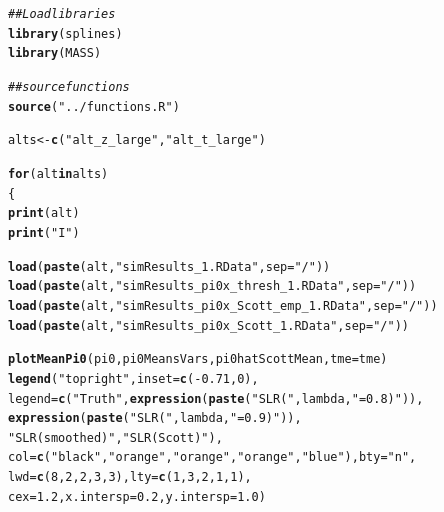 \documentclass{article}\usepackage[]{graphicx}\usepackage[]{color}
\makeatletter
\newcommand{\hlnum}[1]{\textcolor[rgb]{0.686,0.059,0.569}{#1}}%
\newcommand{\hlstr}[1]{\textcolor[rgb]{0.192,0.494,0.8}{#1}}%
\newcommand{\hlcom}[1]{\textcolor[rgb]{0.678,0.584,0.686}{\textit{#1}}}%
\newcommand{\hlopt}[1]{\textcolor[rgb]{0,0,0}{#1}}%
\newcommand{\hlstd}[1]{\textcolor[rgb]{0.345,0.345,0.345}{#1}}%
\newcommand{\hlkwa}[1]{\textcolor[rgb]{0.161,0.373,0.58}{\textbf{#1}}}%
\newcommand{\hlkwb}[1]{\textcolor[rgb]{0.69,0.353,0.396}{#1}}%
\newcommand{\hlkwc}[1]{\textcolor[rgb]{0.333,0.667,0.333}{#1}}%
\newcommand{\hlkwd}[1]{\textcolor[rgb]{0.737,0.353,0.396}{\textbf{#1}}}%
\newenvironment{kframe}{%
 \def\at@end@of@kframe{}%
 \ifinner\ifhmode%
  \def\at@end@of@kframe{\end{minipage}}%
  \begin{minipage}{\columnwidth}%
 \fi\fi%
 \def\FrameCommand##1{\hskip\@totalleftmargin \hskip-\fboxsep
 \colorbox{shadecolor}{##1}\hskip-\fboxsep
     \hskip-\linewidth \hskip-\@totalleftmargin \hskip\columnwidth}%
 \MakeFramed {\advance\hsize-\width
   \@totalleftmargin\z@ \linewidth\hsize
   \@setminipage}}%
 {\par\unskip\endMakeFramed%
 \at@end@of@kframe}
\newenvironment{knitrout}{}{} %
\makeatother
\begin{document}
\begin{knitrout}
\color{fgcolor}\begin{kframe}
\begin{alltt}
\hlcom{## Load libraries}
\hlkwd{library}\hlstd{(splines)}
\hlkwd{library}\hlstd{(MASS)}

\hlcom{##source functions}
\hlkwd{source}\hlstd{(}\hlstr{"../functions.R"}\hlstd{)}
\end{alltt}
\end{kframe}
\end{knitrout}

\begin{knitrout}
\color{fgcolor}\begin{kframe}
\begin{alltt}
\hlstd{alts} \hlkwb{<-} \hlkwd{c}\hlstd{(}\hlstr{"alt_z_large"}\hlstd{,}\hlstr{"alt_t_large"}\hlstd{)}

\hlkwa{for}\hlstd{(alt} \hlkwa{in} \hlstd{alts)}
\hlstd{\{}
  \hlkwd{print}\hlstd{(alt)}
  \hlkwd{print}\hlstd{(}\hlstr{"I"}\hlstd{)}

  \hlkwd{load}\hlstd{(}\hlkwd{paste}\hlstd{(alt,}\hlstr{"simResults_1.RData"}\hlstd{,}\hlkwc{sep}\hlstd{=}\hlstr{"/"}\hlstd{))}
  \hlkwd{load}\hlstd{(}\hlkwd{paste}\hlstd{(alt,}\hlstr{"simResults_pi0x_thresh_1.RData"}\hlstd{,}\hlkwc{sep}\hlstd{=}\hlstr{"/"}\hlstd{))}
  \hlkwd{load}\hlstd{(}\hlkwd{paste}\hlstd{(alt,}\hlstr{"simResults_pi0x_Scott_emp_1.RData"}\hlstd{,}\hlkwc{sep}\hlstd{=}\hlstr{"/"}\hlstd{))}
  \hlkwd{load}\hlstd{(}\hlkwd{paste}\hlstd{(alt,}\hlstr{"simResults_pi0x_Scott_1.RData"}\hlstd{,}\hlkwc{sep}\hlstd{=}\hlstr{"/"}\hlstd{))}

  \hlkwd{plotMeanPi0}\hlstd{(pi0, pi0MeansVars, pi0hatScottMean,} \hlkwc{tme}\hlstd{=tme)}
  \hlkwd{legend}\hlstd{(}\hlstr{"topright"}\hlstd{,} \hlkwc{inset}\hlstd{=}\hlkwd{c}\hlstd{(}\hlopt{-}\hlnum{0.71}\hlstd{,}\hlnum{0}\hlstd{),}
         \hlkwc{legend}\hlstd{=}\hlkwd{c}\hlstd{(}\hlstr{"Truth"}\hlstd{,} \hlkwd{expression}\hlstd{(}\hlkwd{paste}\hlstd{(}\hlstr{"SLR ("}\hlstd{, lambda,} \hlstr{"=0.8)"}\hlstd{)),}
                  \hlkwd{expression}\hlstd{(}\hlkwd{paste}\hlstd{(}\hlstr{"SLR ("}\hlstd{, lambda,} \hlstr{"=0.9)"}\hlstd{)),}
                  \hlstr{"SLR (smoothed)"}\hlstd{,} \hlstr{"SLR (Scott)"}\hlstd{),}
         \hlkwc{col}\hlstd{=}\hlkwd{c}\hlstd{(}\hlstr{"black"}\hlstd{,} \hlstr{"orange"}\hlstd{,} \hlstr{"orange"}\hlstd{,} \hlstr{"orange"}\hlstd{,} \hlstr{"blue"}\hlstd{),} \hlkwc{bty}\hlstd{=}\hlstr{"n"}\hlstd{,}
         \hlkwc{lwd}\hlstd{=}\hlkwd{c}\hlstd{(}\hlnum{8}\hlstd{,}\hlnum{2}\hlstd{,}\hlnum{2}\hlstd{,}\hlnum{3}\hlstd{,}\hlnum{3}\hlstd{),} \hlkwc{lty}\hlstd{=}\hlkwd{c}\hlstd{(}\hlnum{1}\hlstd{,}\hlnum{3}\hlstd{,}\hlnum{2}\hlstd{,}\hlnum{1}\hlstd{,}\hlnum{1}\hlstd{),}
         \hlkwc{cex}\hlstd{=}\hlnum{1.2}\hlstd{,} \hlkwc{x.intersp}\hlstd{=}\hlnum{0.2}\hlstd{,} \hlkwc{y.intersp}\hlstd{=}\hlnum{1.0}\hlstd{)}


\end{alltt}
\end{kframe}
\end{knitrout}
\end{document}
